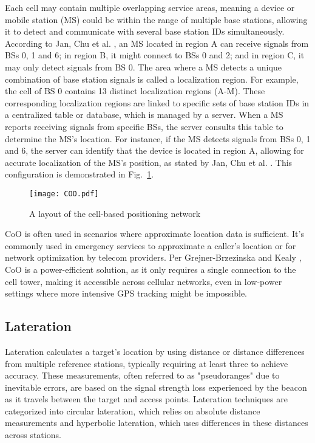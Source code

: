 Each cell may contain multiple overlapping service areas, meaning a device or mobile station (MS) could be within the range of multiple base stations, allowing it to detect and communicate with several base station IDs simultaneously. According to Jan, Chu et al. \cite{jan2004improving}, an MS located in region A can receive signals from BSs 0, 1 and 6; in region B, it might connect to BSs 0 and 2; and in region C, it may only detect signals from BS 0. The area where a MS detects a unique combination of base station signals is called a localization region. For example, the cell of BS 0 contains 13 distinct localization regions (A-M).
These corresponding localization regions are linked to specific sets of base station IDs in a centralized table or database, which is managed by a server. When a MS reports receiving signals from specific BSs, the server consults this table to determine the MS's location. For instance, if the MS detects signals from BSs 0, 1 and 6, the server can identify that the device is located in region A, allowing for accurate localization of the MS's position, as stated by Jan, Chu et al. \cite{jan2004improving}. This configuration is demonstrated in Fig.~\ref{fig:coo}.

\begin{figure}[htbp]
    \centering
    \texttt{[image: COO.pdf]}
    \caption{A layout of the cell-based positioning network \cite{jan2004improving}}
    \label{fig:coo}
\end{figure}

CoO is often used in scenarios where approximate location data is sufficient. It's commonly used in emergency services to approximate a caller's location or for network optimization by telecom providers. Per Grejner-Brzezinska and Kealy \cite{grejner2004positioning}, CoO is a power-efficient solution, as it only requires a single connection to the cell tower, making it accessible across cellular networks, even in low-power settings where more intensive GPS tracking might be impossible.

\subsection{Lateration}
Lateration calculates a target's location by using distance or distance differences from multiple reference stations, typically requiring at least three to achieve accuracy. These measurements, often referred to as "pseudoranges" due to inevitable errors, are based on the signal strength loss experienced by the beacon as it travels between the target and access points. Lateration techniques are categorized into circular lateration, which relies on absolute distance measurements and hyperbolic lateration, which uses differences in these distances across stations.

